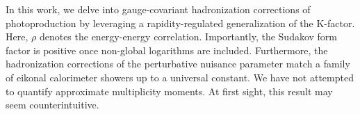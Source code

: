 In this work, we delve into gauge-covariant hadronization corrections of
photoproduction by leveraging a rapidity-regulated generalization of the
K-factor. Here, $\rho$ denotes the energy-energy correlation.
Importantly, the Sudakov form factor is positive once non-global
logarithms are included. Furthermore, the hadronization corrections of
the perturbative nuisance parameter match a family of eikonal
calorimeter showers up to a universal constant. We have not attempted to
quantify approximate multiplicity moments. At first sight, this result
may seem counterintuitive.

